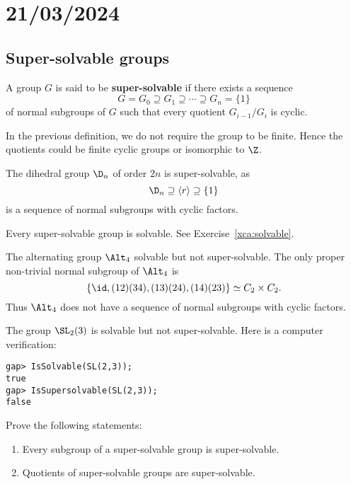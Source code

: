 \section{21/03/2024}

\subsection{Super-solvable groups}

\begin{definition}
A group $G$ is said to be \textbf{super-solvable} if there exists a sequence 
\[
G=G_0\supseteq G_1\supseteq\cdots\supseteq G_n=\{1\}
\]
of normal subgroups of $G$ such that every 
quotient $G_{i-1}/G_i$ is cyclic. 
\end{definition}

In the previous definition, we do not require the group to be finite. Hence the quotients 
could be finite cyclic groups or isomorphic to $\Z$. 

\begin{example}
The dihedral group $\D_{n}$ of order $2n$ is super-solvable, as 
\[	
\D_{n}\supseteq \langle
r\rangle\supseteq \{1\}
\]
is a sequence of normal subgroups with cyclic factors. 
\end{example}

Every super-solvable group is solvable. See Exercise~\ref{xca:solvable}.

\begin{example}
The alternating group $\Alt_4$ solvable but not super-solvable. The only 
proper non-trivial normal subgroup of $\Alt_4$ is 
	\[
	\{\id,(12)(34),(13)(24),(14)(23)\}\simeq C_2\times C_2.
	\]
Thus $\Alt_4$ does not have a sequence of normal subgroups 
with cyclic factors. 
\end{example}


\begin{example}
The group $\SL_2(3)$ is solvable but not super-solvable. Here is a computer verification: 
\begin{lstlisting}
gap> IsSolvable(SL(2,3));
true
gap> IsSupersolvable(SL(2,3));
false
\end{lstlisting}
\end{example}

\begin{exercise}
\label{xca:super}
Prove the following statements: 
\begin{enumerate}
\item Every subgroup of a super-solvable group is super-solvable. 
\item Quotients of super-solvable groups are super-solvable. 
\end{enumerate}
\end{exercise}

